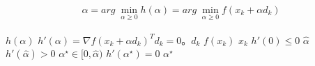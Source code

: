 \begin{frame}
\begin{equation} \alpha=arg\;
\underset{\alpha\geq 0}{\min}h(\alpha)=arg\;\underset{\alpha\geq 0}{\min}f(x_k+\alpha d_k) \end{equation}\\

\(h(\alpha)\)
\(h'(\alpha)=\nabla f(x_k+\alpha d_k)^Td_k=0\)。\(d_k\)
\(f(x_k)\)
\(x_k\)
\(h'(0)\leq 0\)
\(\hat{\alpha}\)
\(h'(\hat{\alpha})>0\)
\(\alpha^{\star}\in [0,\hat{\alpha})\)
\(h'(\alpha^{\star})=0\)
\(\alpha^{\star}\)
\end{frame}
\ifx\allfiles\undefined

\fi
